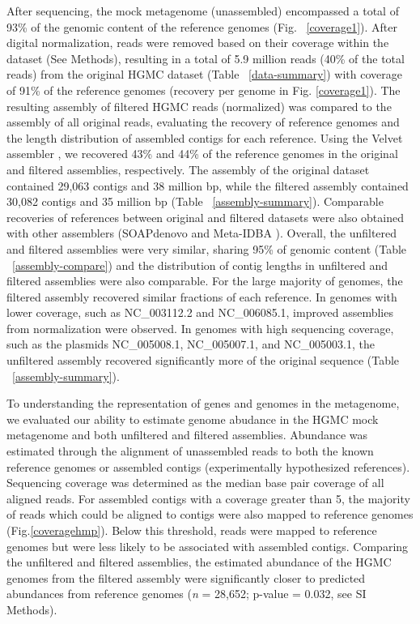\documentclass{pnastwo}
\begin{document}
\begin{article}
After sequencing, the mock metagenome (unassembled) encompassed a total of 93\% of the genomic content of the reference genomes (Fig. ~\ref{coverage1}).
After digital normalization, reads were removed based on their coverage within
the dataset (See Methods), resulting in a total of 5.9 million reads (40\% of
the total reads) from the original HGMC dataset (Table ~\ref{data-summary}) with coverage of 91\% of the reference
genomes (recovery per genome in Fig. \ref{coverage1}). The resulting assembly of filtered HGMC reads (normalized) was compared to the assembly of all original reads, evaluating the recovery of reference genomes and the length distribution of assembled contigs for each reference.  Using the Velvet assembler
\cite{Zerbino:2008p665}, we recovered 43\% and 44\% of the reference genomes in
the original and filtered assemblies, respectively. The assembly of the original
dataset contained 29,063 contigs and 38 million bp, while the filtered assembly
contained 30,082 contigs and 35 million bp (Table ~\ref{assembly-summary}).
Comparable recoveries of references between original and filtered datasets were
also obtained with other assemblers (SOAPdenovo \cite{Li:2010jz} and Meta-IDBA
\cite{Peng:2011p898}). Overall, the unfiltered and filtered assemblies were very
similar, sharing 95\% of genomic content (Table ~\ref{assembly-compare}) and the distribution
of contig lengths in unfiltered and filtered assemblies were also comparable. For the
large majority of genomes, the filtered assembly recovered similar fractions of each reference.  In genomes with lower coverage, such as NC\_003112.2 and NC\_006085.1, improved assemblies from normalization were observed.  In genomes with high sequencing coverage, such as the plasmids  NC\_005008.1, NC\_005007.1, and NC\_005003.1, the unfiltered assembly recovered significantly more of the original sequence (Table ~\ref{assembly-summary}).   

To understanding the representation of genes and genomes in the metagenome, we evaluated our ability to estimate genome abudance in the HGMC mock metagenome and both unfiltered and filtered assemblies. Abundance was estimated through
the alignment of unassembled reads to both the known reference genomes or assembled
contigs (experimentally hypothesized references). Sequencing coverage was determined as the median base pair coverage of
all aligned reads. For assembled contigs with a coverage greater than 5, the
majority of reads which could be aligned to contigs were also mapped to reference
genomes (Fig.\ref{coveragehmp}). Below this threshold, reads were mapped to reference
genomes but were less likely to be associated with assembled contigs. Comparing
the unfiltered and filtered assemblies, the estimated abundance of the HGMC
genomes from the filtered assembly were significantly closer to predicted
abundances from reference genomes (\emph{n} = 28,652; p-value = 0.032, see SI
Methods).


\end{article}
\end{document}
